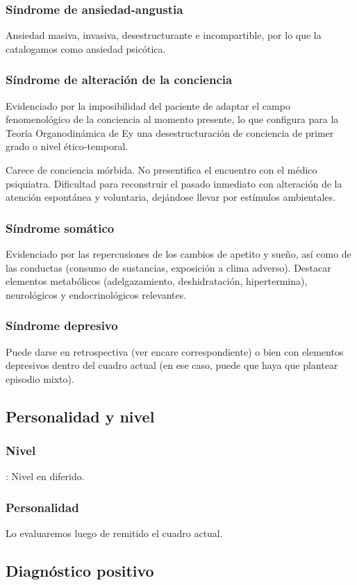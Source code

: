 \subsubsection*{Síndrome de ansiedad-angustia}
Ansiedad masiva, invasiva, desestructurante e incompartible, por lo que la catalogamos como ansiedad psicótica.
\subsubsection*{Síndrome de alteración de la conciencia}
Evidenciado por la imposibilidad del paciente de adaptar el campo fenomenológico de la conciencia al momento presente, lo que configura para la Teoría Organodinámica de Ey una desestructuración de conciencia de primer grado o nivel ético-temporal.

Carece de conciencia mórbida. No presentifica el encuentro con el médico psiquiatra. Dificultad para reconstruir el pasado inmediato con alteración de la atención espontánea y voluntaria, dejándose llevar por estímulos ambientales.
\subsubsection*{Síndrome somático}
Evidenciado por las repercusiones de los cambios de apetito y sueño, así como de las conductas (consumo de sustancias, exposición a clima adverso). Destacar elementos metabólicos (adelgazamiento, deshidratación, hipertermina), neurológicos y endocrinológicos relevantes.
\subsubsection*{Síndrome depresivo}
Puede darse en retrospectiva (ver encare correspondiente) o bien con elementos depresivos dentro del cuadro actual (en ese caso, puede que haya que plantear episodio mixto).
\subsection*{Personalidad y nivel}
\subsubsection*{Nivel}
\faPaste: Nivel en diferido.
\subsubsection*{Personalidad}
Lo evaluaremos luego de remitido el cuadro actual.
\subsection*{Diagnóstico positivo}

